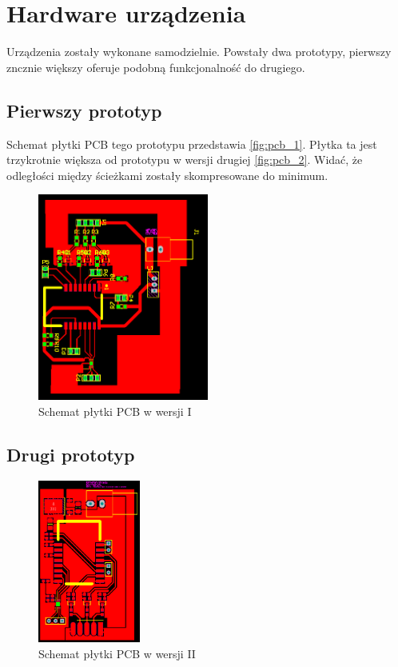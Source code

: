 \section{Hardware urządzenia}
\label{sec:hardware}
Urządzenia zostały wykonane samodzielnie. Powstały dwa prototypy, pierwszy zncznie większy oferuje podobną funkcjonalność do drugiego. 

\subsection{Pierwszy prototyp}

Schemat płytki PCB tego prototypu przedstawia \autoref{fig:pcb_1}. Płytka ta jest trzykrotnie większa od prototypu w wersji drugiej \autoref{fig:pcb_2}. Widać, że odległości między ścieżkami zostały skompresowane do minimum. 

\begin{figure}[!htbp]
	\centering
	\includegraphics[width=0.5\textwidth]{images/fig02-PCBv1.png}
	\caption[Schemat płytki PCB v1.]{Schemat płytki PCB w wersji I}
	\label{fig:pcb_1}
\end{figure}


\subsection{Drugi prototyp}

\begin{figure}[!htbp]
	\centering
	\includegraphics[width=0.3\textwidth]{images/fig03-PCBv2.png}
	\caption[Schemat płytki PCB v2.]{Schemat płytki PCB w wersji II}
	\label{fig:pcb_2}
\end{figure}


